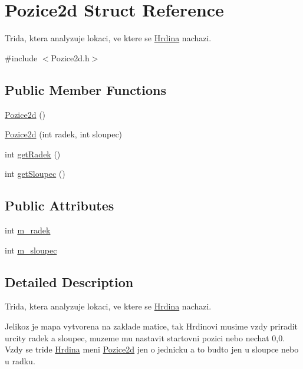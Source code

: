 \hypertarget{struct_pozice2d}{\section{Pozice2d Struct Reference}
\label{struct_pozice2d}
}


Trida, ktera analyzuje lokaci, ve ktere se \hyperlink{class_hrdina}{Hrdina} nachazi.  




{\ttfamily \#include $<$Pozice2d.\-h$>$}

\subsection*{Public Member Functions}
\begin{DoxyCompactItemize}
\item 
\hyperlink{struct_pozice2d_adbac3715165fb3216eaf250e3c9f2adb}{Pozice2d} ()
\item 
\hyperlink{struct_pozice2d_a4036a334c595a49b8a744272c5acc0e9}{Pozice2d} (int radek, int sloupec)
\item 
int \hyperlink{struct_pozice2d_af7e5542d50c4bf07074d33038bd48d75}{get\-Radek} ()
\item 
int \hyperlink{struct_pozice2d_ad7af4eb55f87498112ecd5ca56d70c20}{get\-Sloupec} ()
\end{DoxyCompactItemize}
\subsection*{Public Attributes}
\begin{DoxyCompactItemize}
\item 
int \hyperlink{struct_pozice2d_a8ae2a4f9f73a09127963ab072c6aaed0}{m\-\_\-radek}
\item 
int \hyperlink{struct_pozice2d_ab6a744127dd182633f77551b7240938f}{m\-\_\-sloupec}
\end{DoxyCompactItemize}


\subsection{Detailed Description}
Trida, ktera analyzuje lokaci, ve ktere se \hyperlink{class_hrdina}{Hrdina} nachazi. 

Jelikoz je mapa vytvorena na zaklade matice, tak Hrdinovi musime vzdy priradit urcity radek a sloupec, muzeme mu nastavit startovni pozici nebo nechat 0,0. Vzdy se tride \hyperlink{class_hrdina}{Hrdina} meni \hyperlink{struct_pozice2d}{Pozice2d} jen o jednicku a to budto jen u sloupce nebo u radku. 

